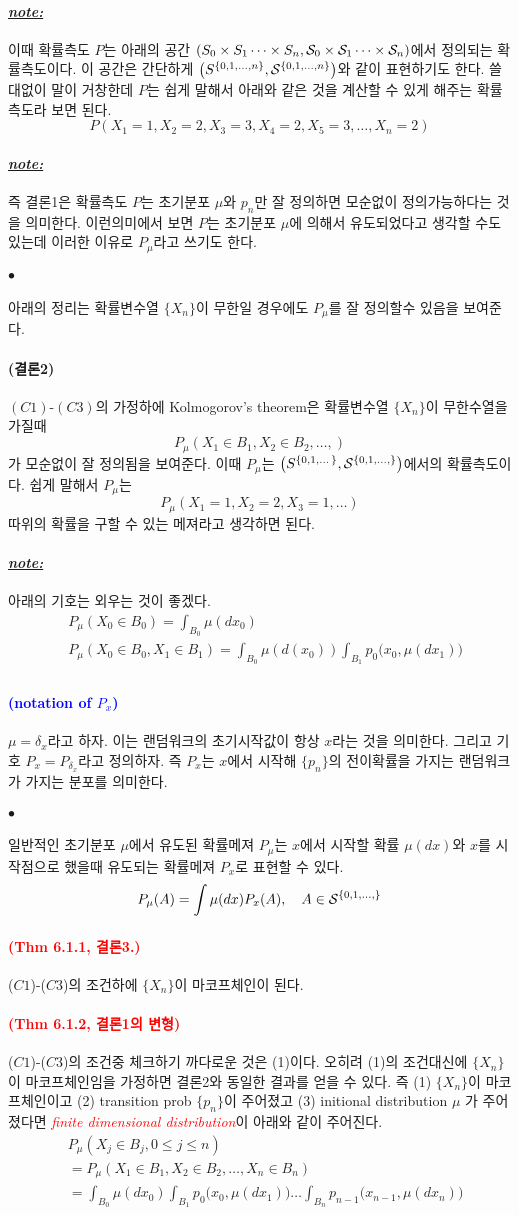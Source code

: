 \documentclass[12pt,oneside,english]{book}
\def\ck{\paragraph{\Large$\bullet$}\Large}
\def\note{\paragraph{\Large\textit{\underline{note:}}}\Large}
\newcommand{\para}[1]{\paragraph{\Large(#1)}\Large}
\newcommand{\parablue}[1]{\paragraph{\Large\textcolor{blue}{(#1)}}\Large}
\newcommand{\parared}[1]{\paragraph{\Large\textcolor{red}{(#1)}}\Large}
\begin{document}
\note 이때 확률측도 $P$는 아래의 공간 $
(S_0\times S_1 \dots \times S_n, {\cal S}_0\times {\cal S}_1 \dots \times {\cal S}_n)$에서 정의되는 확률측도이다. 이 공간은 간단하게 $
\left(S^{\{0,1,\dots,n\}},{\cal S}^{\{0,1,\dots,n\}}\right)$와 같이 표현하기도 한다. 쓸대없이 말이 거창한데 $P$는 쉽게 말해서 아래와 같은 것을 계산할 수 있게 해주는 확률측도라 보면 된다. 
\[
P(X_1=1,X_2=2,X_3=3,X_4=2,X_5=3,\dots,X_n=2)
\]

\note 즉 결론1은 확률측도 $P$는 초기분포 $\mu$와 $p_n$만 잘 정의하면 모순없이 정의가능하다는 것을 의미한다. 이런의미에서 보면 $P$는 초기분포 $\mu$에 의해서 유도되었다고 생각할 수도 있는데 이러한 이유로 $P_{\mu}$라고 쓰기도 한다. 

\ck 아래의 정리는 확률변수열 $\{X_n\}$이 무한일 경우에도 $P_{\mu}$를 잘 정의할수 있음을 보여준다. 

\para{결론2} $(C1)$-$(C3)$의 가정하에 Kolmogorov's theorem은 확률변수열 $\{X_n\}$이 무한수열을 가질때
\[
P_{\mu}(X_1\in B_1, X_2\in B_2, \dots, )
\]
가 모순없이 잘 정의됨을 보여준다. 이때 $P_{\mu}$는 $\left(S^{\{0,1,\dots\}},{\cal S}^{\{0,1,\dots,\}}\right)$에서의 확률측도이다. 쉽게 말해서 $P_{\mu}$는 
\[
P_{\mu}(X_1=1,X_2=2,X_3=1,\dots)
\]
따위의 확률을 구할 수 있는 메져라고 생각하면 된다. 

\note 아래의 기호는 외우는 것이 좋겠다. 
\begin{align*}
& P_{\mu}(X_0\in B_0)= \int_{B_0} \mu(dx_0)\\ 
& P_{\mu}(X_0\in B_0,X_1 \in B_1)= \int_{B_0} \mu(d(x_0)) \int_{B_1} p_0\big(x_0,\mu(dx_1)\big) \\ 
\end{align*}

\parablue{notation of $P_x$}
$\mu=\delta_x$라고 하자. 이는 랜덤워크의 초기시작값이 항상 $x$라는 것을 의미한다. 그리고 기호 $P_x=P_{\delta_x}$라고 정의하자. 즉 $P_x$는 $x$에서 시작해 $\{p_n\}$의 전이확률을 가지는 랜덤워크가 가지는 분포를 의미한다. 

\ck 일반적인 초기분포 $\mu$에서 유도된 확률메져 $P_{\mu}$는 $x$에서 시작할 확률 $\mu(dx)$와 $x$를 시작점으로 했을때 유도되는 확률메져 $P_{x}$로 표현할 수 있다. 
\[
P_{\mu}(A)=\int \mu(dx)P_x(A), \quad A \in {\cal S}^{\{0,1,\dots,\}}
\]


\parared{Thm 6.1.1, 결론3.} ($C1$)-($C3$)의 조건하에 $\{X_n\}$이 마코프체인이 된다. 


\parared{Thm 6.1.2, 결론1의 변형} ($C1$)-($C3$)의 조건중 체크하기 까다로운 것은 (1)이다. 오히려 (1)의 조건대신에 $\{X_n\}$이 마코프체인임을 가정하면 결론2와 동일한 결과를 얻을 수 있다. 즉 (1) $\{X_n\}$이 마코프체인이고 (2) transition prob $\{p_n\}$이 주어졌고 (3) initional distribution $\mu$ 가 주어졌다면 \textcolor{red}{\emph{finite dimensional distribution}}이 아래와 같이 주어진다. 
\begin{align*}
& P_{\mu}(X_j \in B_j, 0\leq j \leq n) \\ 
& = P_{\mu}(X_1\in B_1, X_2\in B_2, \dots, X_n \in B_n)\\
& = \int_{B_0}\mu(dx_0)\int_{B_1}p_0\big(x_0,\mu(dx_1)\big)\dots\int_{B_n}p_{n-1}\big(x_{n-1},\mu(dx_n)\big)
\end{align*}
\end{document}
